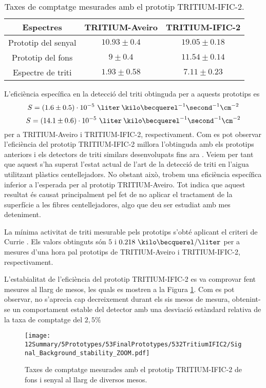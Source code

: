 \begin{table}[htbp]
\centering{}%
\begin{tabular}{ccc}
\toprule 
Espectres & TRITIUM-Aveiro & TRITIUM-IFIC-2  \tabularnewline
\midrule
\midrule 
Prototip del senyal & $10.93 \pm 0.4$ & $19.05 \pm 0.18$ \tabularnewline
Prototip del fons & $9 \pm 0.4$ & $11.54 \pm 0.14$ \tabularnewline  
Espectre de triti & $1.93 \pm 0.58$ & $7.11 \pm 0.23$ \tabularnewline
\bottomrule
\end{tabular}
\caption{Taxes de comptatge mesurades amb el prototip TRITIUM-IFIC-2.}
\label{tab:ContesPerSegonTRITIUMIFIC2}
\end{table}

L'eficiència específica en la detecció del triti obtinguda per a aquests prototips es
$$S = (1.6 \pm 0.5)\cdot{} 10^{-5}~\liter\:\kilo\becquerel^{-1}\second^{-1}\cm^{-2}$$
$$S = (14.1 \pm 0.6)\cdot{} 10^{-5}~\liter\:\kilo\becquerel^{-1}\second^{-1}\cm^{-2}$$
per a TRITIUM-Aveiro i TRITIUM-IFIC-2, respectivament. Com es pot observar l'eficiència del prototip TRITIUM-IFIC-2 millora l'obtinguda amb els prototips anteriors i els detectors de triti similars desenvolupats fins ara \cite{Hofstetter1, Hofstetter2}. Veiem per tant que aquest s'ha superat l'estat actual de l'art de la detecció de triti en l'aigua utilitzant plàstics centellejadors. No obstant això, trobem una eficiència específica inferior a l'esperada per al prototip TRITIUM-Aveiro. Tot indica que aquest resultat és causat principalment pel fet de no aplicar el tractament de la superfície a les fibres centellejadores, algo que deu ser estudiat amb mes deteniment.

La mínima activitat de triti mesurable pels prototips s'obté aplicant el criteri de Currie \cite{Knoll}. Els valors obtinguts són $5$ i $0.218~\kilo\becquerel/\liter$ per a mesures d'una hora pal prototips de TRITIUM-Aveiro i TRITIUM-IFIC-2, respectivament. 

L'estabialitat de l'eficiència del prototip TRITIUM-IFIC-2 es va comprovar fent mesures al llarg de mesos, les quals es mostren a la Figura \ref{fig:MonitoritzacioTRITIUMIFIC2}. Com es pot observar, no s'aprecia cap decreixement durant els sis mesos de mesura, obtenint-se un comportament estable del detector amb una desviació estàndard relativa de la taxa de comptatge del $2,5\%$

\begin{figure}[h]
\centering
\texttt{[image: 12Summary/5Prototypes/53FinalPrototypes/532TritiumIFIC2/Signal\_Background\_stability\_ZOOM.pdf]}
\caption{Taxes de comptatge mesurades amb el prototip TRITIUM-IFIC-2 de fons i senyal al llarg de diversos mesos.\label{fig:MonitoritzacioTRITIUMIFIC2}}
\end{figure}

